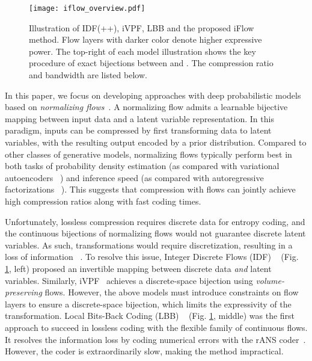 \documentclass{article}
\begin{document}
\begin{figure}[t]
\begin{center}
\texttt{[image: iflow\_overview.pdf]}\\
\end{center}
\caption{Illustration of IDF(++), iVPF, LBB and the proposed iFlow method. Flow layers with darker color denote higher expressive power. The top-right of each model illustration shows the key procedure of exact bijections between  and . The compression ratio and bandwidth are listed below.}
\label{fig:illustration}
\end{figure}





In this paper, we focus on developing approaches with deep probabilistic models based on \textit{normalizing flows}~\cite{dinh2016density,kingma2018glow,prenger2019waveglow,kumar2019videoflow,chen2020vflow,lippe2020categorical,kim2020softflow}. A normalizing flow admits a learnable bijective mapping between input data and a latent variable representation. In this paradigm, inputs can be compressed by first transforming data to latent variables, with the resulting output encoded by a prior distribution. Compared to other classes of generative models, normalizing flows typically perform best in both tasks of probability density estimation (as compared with variational autoencoders ~\cite{kingma2013auto,higgins2016beta,child2020very}) and inference speed (as compared with autoregressive factorizations ~\cite{salimans2017pixelcnn++,van2016conditional,jun2020distribution}). This suggests that compression with flows can jointly achieve high compression ratios along with fast coding times. 





Unfortunately, lossless compression requires discrete data for entropy coding, and the continuous bijections of normalizing flows would not guarantee discrete latent variables. As such, transformations would require discretization, resulting in a loss of information ~\cite{zhang2021ivpf,behrmann2020understanding}. To resolve this issue, Integer Discrete Flows (IDF) ~\cite{hoogeboom2019integer, berg2020idf++} (Fig. \ref{fig:illustration}, left) proposed an invertible mapping between discrete data \textit{and} latent variables. Similarly, iVPF~\cite{zhang2021ivpf} achieves a discrete-space bijection using \textit{volume-preserving} flows. However, the above models must introduce constraints on flow layers to ensure a discrete-space bijection, which limits the expressivity of the transformation. Local Bits-Back Coding (LBB) ~\cite{ho2019compression} (Fig. \ref{fig:illustration}, middle) was the first approach to succeed in lossless coding with the flexible family of continuous flows. It resolves the information loss by coding numerical errors with the rANS coder~\cite{duda2013asymmetric}. However, the coder is extraordinarily slow, making the method impractical.
\end{document}
